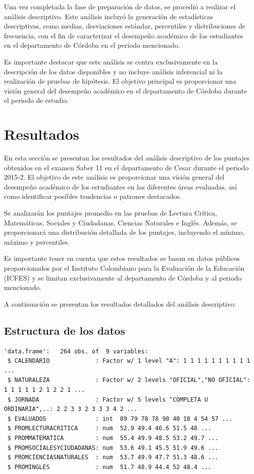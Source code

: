 \documentclass[12pt,a4paper,]{book}
\numberwithin{dummy}{section}
\theoremstyle{ocrenumbox}
\theoremstyle{ocrenumbox}
\theoremstyle{ocrenumbox}
\theoremstyle{ocrenumbox}
\theoremstyle{ocrenum}
\begin{document}
Una vez completada la fase de preparación de datos, se procedió a
realizar el análisis descriptivo. Este análisis incluyó la generación de
estadísticas descriptivas, como medias, desviaciones estándar,
percentiles y distribuciones de frecuencia, con el fin de caracterizar
el desempeño académico de los estudiantes en el departamento de Córdoba
en el periodo mencionado.

Es importante destacar que este análisis se centra exclusivamente en la
descripción de los datos disponibles y no incluye análisis inferencial
ni la realización de pruebas de hipótesis. El objetivo principal es
proporcionar una visión general del desempeño académico en el
departamento de Córdoba durante el periodo de estudio.

\hypertarget{resultados}{%
\chapter{Resultados}\label{resultados}}

En esta sección se presentan los resultados del análisis descriptivo de
los puntajes obtenidos en el examen Saber 11 en el departamento de Cesar
durante el periodo 2015-2. El objetivo de este análisis es proporcionar
una visión general del desempeño académico de los estudiantes en las
diferentes áreas evaluadas, así como identificar posibles tendencias o
patrones destacados.

Se analizarán los puntajes promedio en las pruebas de Lectura Crítica,
Matemáticas, Sociales y Ciudadanas, Ciencias Naturales e Inglés. Además,
se proporcionará una distribución detallada de los puntajes, incluyendo
el mínimo, máximo y percentiles.

Es importante tener en cuenta que estos resultados se basan en datos
públicos proporcionados por el Instituto Colombiano para la Evaluación
de la Educación (ICFES) y se limitan exclusivamente al departamento de
Córdoba y al periodo mencionado.

A continuación se presentan los resultados detallados del análisis
descriptivo:

\hypertarget{estructura-de-los-datos}{%
\section{Estructura de los datos}\label{estructura-de-los-datos}}

\begin{verbatim}
'data.frame':   264 obs. of  9 variables:
 $ CALENDARIO             : Factor w/ 1 level "A": 1 1 1 1 1 1 1 1 1 1 ...
 $ NATURALEZA             : Factor w/ 2 levels "OFICIAL","NO OFICIAL": 1 1 1 1 1 2 1 2 2 1 ...
 $ JORNADA                : Factor w/ 5 levels "COMPLETA U ORDINARIA",..: 2 2 3 3 2 3 3 3 4 2 ...
 $ EVALUADOS              : int  89 79 78 78 90 40 18 4 54 57 ...
 $ PROMLECTURACRITICA     : num  52.9 49.4 46.6 51.5 48 ...
 $ PROMMATEMATICA         : num  55.4 49.9 48.5 53.2 49.7 ...
 $ PROMSOCIALESYCIUDADANAS: num  53.6 49.1 45.5 51.9 49.6 ...
 $ PROMCIENCIASNATURALES  : num  53.7 49.9 47.7 51.3 48.6 ...
 $ PROMINGLES             : num  51.7 48.9 44.4 52 48.4 ...
\end{verbatim}
\end{document}

